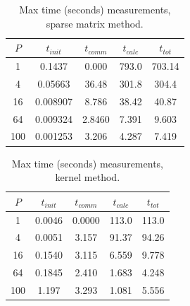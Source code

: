 \documentclass[a4paper,11pt]{article}
\begin{document}
\begin{table}[h]
\def\arraystretch{1.2}
\begin{center}
\caption{Max time (seconds) measurements, sparse matrix method.}
\label{tab:matrix}
\begin{tabular}{| c | c | c | c | c |}
\hline
$P$ & $t_{init}$ & $t_{comm}$ & $t_{calc}$ & $t_{tot}$ \\
\hline
1 & 0.1437 &  0.000 & 793.0 & 703.14\\
\hline
4 & 0.05663 & 36.48 & 301.8 & 304.4\\
\hline
16 & 0.008907 & 8.786 & 38.42 & 40.87\\
\hline
64 & 0.009324 & 2.8460 & 7.391 & 9.603\\
\hline
100 & 0.001253 & 3.206 & 4.287 & 7.419\\
\hline
\end{tabular}
\end{center}
\end{table}

\begin{table}[h]
\def\arraystretch{1.2}
\begin{center}
\caption{Max time (seconds) measurements, kernel method.}
\label{tab:kernal}
\begin{tabular}{| c | c | c | c | c |}
\hline
$P$ & $t_{init}$ & $t_{comm}$ & $t_{calc}$ & $t_{tot}$ \\
\hline
1 & 0.0046 & 0.0000 &113.0 &113.0\\
\hline
4 & 0.0051& 3.157 & 91.37 & 94.26\\
\hline
16 & 0.1540 & 3.115 & 6.559 & 9.778\\
\hline
64 & 0.1845 & 2.410 &1.683 &4.248 \\
\hline
100 &1.197 & 3.293 & 1.081 & 5.556 \\
\hline
\end{tabular}
\end{center}
\end{table}
\end{document}
